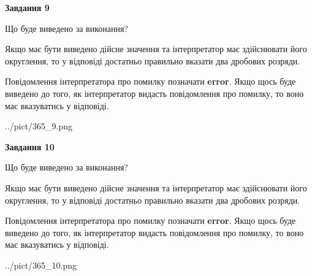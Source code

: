 \documentclass[12pt, ukrainian]{article}
\begin{document}
{\begin {Large}
{\begin {center}\textbf{Завдання 9}\end {center}}\par
Що буде виведено за виконання? \par

Якщо має бути виведено дійсне значення та інтерпретатор має здійснювати його округлення, 
то у відповіді достатньо правильно вказати два дробових розряди.

Повідомлення інтерпретатора про помилку позначати \textbf{error}.
Якщо щось буде виведено до того, як інтерпретатор видасть повідомлення про помилку, 
то воно має вказуватись у відповіді. \par

\begin{center}
	{../pict/365_9.png}
\end{center}
\newpage

{\begin {center}\textbf{Завдання 10}\end {center}}\par
Що буде виведено за виконання? \par

Якщо має бути виведено дійсне значення та інтерпретатор має здійснювати його округлення, 
то у відповіді достатньо правильно вказати два дробових розряди.

Повідомлення інтерпретатора про помилку позначати \textbf{error}.
Якщо щось буде виведено до того, як інтерпретатор видасть повідомлення про помилку, 
то воно має вказуватись у відповіді. \par

\begin{center}
	{../pict/365_10.png}
\end{center}
\newpage

\end {Large}}
\end{document}
